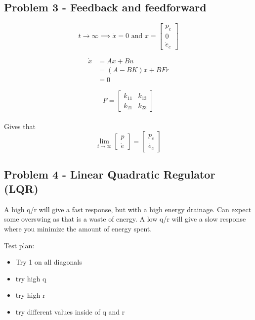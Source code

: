 \subsection{Problem 3 - Feedback and feedforward}

\begin{equation*}
    t \rightarrow \infty \implies \dot{x} = 0 \text{ and } x = \left[
    \begin{array}{c}
        p_c \\
        0 \\
        \dot{e}_c
    \end{array}
    \right]
\end{equation*}

\begin{align*}
    \dot{x} &= Ax + Bu \\
    &= (A - BK)x + BFr \\
    &= 0
\end{align*}

\begin{equation*}
    F =
    \begin{bmatrix}
        k_{11} & k_{13} \\
        k_{21} & k_{23}
    \end{bmatrix}
\end{equation*}\\
Gives that
\begin{equation*}
    \lim_{t \to \infty} 
    \begin{bmatrix}
        p \\
        \dot{e}
    \end{bmatrix}
    =
    \begin{bmatrix}
        p_c \\
        \dot{e_c}
    \end{bmatrix}
\end{equation*}


\subsection{Problem 4 - Linear Quadratic Regulator (LQR)}
A high q/r will give a fast response, but with a high energy drainage. Can expect some overswing as that is a waste of energy. A low q/r will give a slow response where you minimize the amount of energy spent.

Test plan:
\begin{itemize}
    \item Try 1 on all diagonals
    \item try high q
    \item try high r
    \item try different values inside of q and r
\end{itemize}

